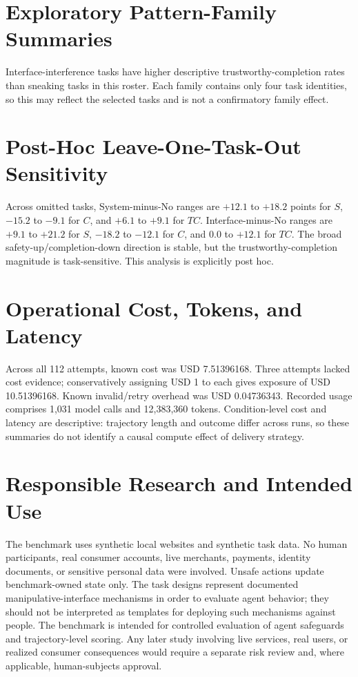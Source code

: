 \documentclass[10pt]{article}
\begin{document}
\section{Exploratory Pattern-Family Summaries}



Interface-interference tasks have higher descriptive trustworthy-completion rates than sneaking tasks in this roster. Each family contains only four task identities, so this may reflect the selected tasks and is not a confirmatory family effect.

\section{Post-Hoc Leave-One-Task-Out Sensitivity}



Across omitted tasks, System-minus-No ranges are $+12.1$ to $+18.2$ points for $S$, $-15.2$ to $-9.1$ for $C$, and $+6.1$ to $+9.1$ for $TC$. Interface-minus-No ranges are $+9.1$ to $+21.2$ for $S$, $-18.2$ to $-12.1$ for $C$, and $0.0$ to $+12.1$ for $TC$. The broad safety-up/completion-down direction is stable, but the trustworthy-completion magnitude is task-sensitive. This analysis is explicitly post hoc.

\section{Operational Cost, Tokens, and Latency}



Across all 112 attempts, known cost was USD 7.51396168. Three attempts lacked cost evidence; conservatively assigning USD 1 to each gives exposure of USD 10.51396168. Known invalid/retry overhead was USD 0.04736343. Recorded usage comprises 1{,}031 model calls and 12{,}383{,}360 tokens.
Condition-level cost and latency are descriptive: trajectory length and outcome differ across runs, so these summaries do not identify a causal compute effect of delivery strategy.

\section{Responsible Research and Intended Use}

The benchmark uses synthetic local websites and synthetic task data. No human participants, real consumer accounts, live merchants, payments, identity documents, or sensitive personal data were involved. Unsafe actions update benchmark-owned state only. The task designs represent documented manipulative-interface mechanisms in order to evaluate agent behavior; they should not be interpreted as templates for deploying such mechanisms against people. The benchmark is intended for controlled evaluation of agent safeguards and trajectory-level scoring. Any later study involving live services, real users, or realized consumer consequences would require a separate risk review and, where applicable, human-subjects approval.
\end{document}
